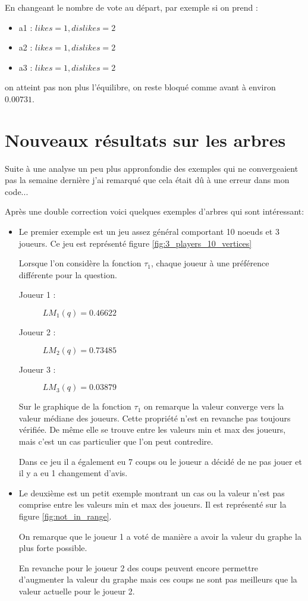 \documentclass[12pt]{article}
\theoremstyle{defi}
\theoremstyle{not}
\theoremstyle{prob}
\begin{document}
    En changeant le nombre de vote au départ, par exemple si on prend :
    \begin{itemize}
      \item a1 : $likes = 1, dislikes = 2$
      \item a2 : $likes = 1, dislikes = 2$
      \item a3 : $likes = 1, dislikes = 2$
    \end{itemize}

    on atteint pas non plus l'équilibre, on reste bloqué comme avant à environ $0.00731$.

  \section{Nouveaux résultats sur les arbres}
    Suite à une analyse un peu plus appronfondie des exemples qui ne convergeaient pas la semaine dernière j'ai remarqué que cela était dû à une erreur dans mon code...

    Après une double correction voici quelques exemples d'arbres qui sont intéressant:\\

    \begin{itemize}
      \item Le premier exemple est un jeu assez général comportant 10 noeuds et 3 joueurs.
        Ce jeu est représenté figure \ref{fig:3_players_10_vertices}

        Lorsque l'on considère la fonction $\tau_1$, chaque joueur à une préférence différente pour la question.
        \begin{description}
          \item[Joueur 1 : ] $LM_1(q) = 0.46622$
          \item[Joueur 2 : ] $LM_2(q) = 0.73485$
          \item[Joueur 3 : ] $LM_3(q) = 0.03879$
        \end{description}

        Sur le graphique de la fonction $\tau_1$ on remarque la valeur converge vers la valeur médiane des joueurs. Cette propriété n'est en revanche pas toujours vérifiée. De même elle se trouve entre les valeurs min et max des joueurs, mais c'est un cas particulier que l'on peut contredire.

        Dans ce jeu il a également eu 7 coups ou le joueur a décidé de ne pas jouer et il y a eu 1 changement d'avis.

      \item Le deuxième est un petit exemple montrant un cas ou la valeur n'est pas comprise entre les valeurs min et max des joueurs.
        Il est représenté sur la figure \ref{fig:not_in_range}.

        On remarque que le joueur 1 a voté de manière a avoir la valeur du graphe la plus forte possible.

        En revanche pour le joueur 2 des coups peuvent encore permettre d'augmenter la valeur du graphe mais ces coups ne sont pas meilleurs que la valeur actuelle pour le joueur 2.
    \end{itemize}
\end{document}
